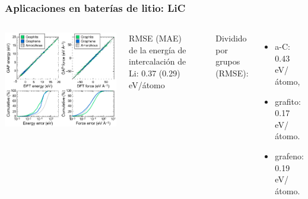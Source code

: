 \documentclass[aspectratio=169]{beamer}
\begin{document}
    \begin{frame}
        \frametitle{Aplicaciones en baterías de litio: LiC}
        
        \begin{columns}
            \begin{center}
                \includegraphics[width=\columnwidth]{LiC-training_testing.png}
            \end{center}

            RMSE (MAE) de la energía de intercalación de Li: 0.37 (0.29) eV/átomo

            \ \pause

            Dividido por grupos (RMSE):
            \begin{itemize}
                \item a-C: 0.43 eV/átomo,
                \item grafito: 0.17 eV/átomo.
                \item grafeno: 0.19 eV/átomo.
            \end{itemize}
        \end{columns}
    \end{frame}
    
\end{document}
